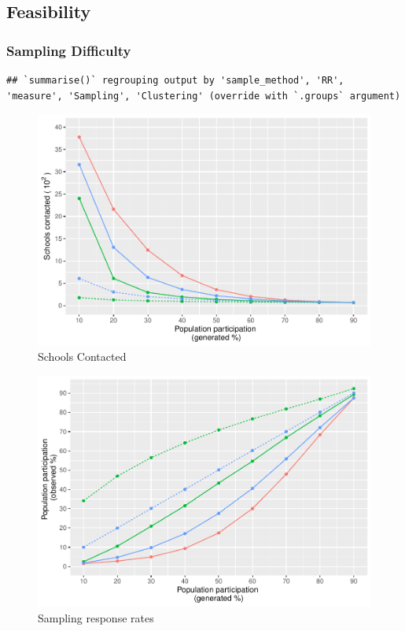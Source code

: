 \documentclass[
  english,
  man,floatsintext]{apa6}
\begin{document}
\hypertarget{feasibility}{%
\subsection{Feasibility}\label{feasibility}}

\hypertarget{sampling-difficulty}{%
\subsubsection{Sampling Difficulty}\label{sampling-difficulty}}

\begin{verbatim}
## `summarise()` regrouping output by 'sample_method', 'RR', 'measure', 'Sampling', 'Clustering' (override with `.groups` argument)
\end{verbatim}

\begin{figure}
\centering
\includegraphics{5---Analysis_files/figure-latex/unnamed-chunk-27-1.pdf}
\caption{\label{fig:unnamed-chunk-27}Schools Contacted}
\end{figure}

\begin{figure}
\centering
\includegraphics{5---Analysis_files/figure-latex/unnamed-chunk-28-1.pdf}
\caption{\label{fig:unnamed-chunk-28}Sampling response rates}
\end{figure}
\end{document}
